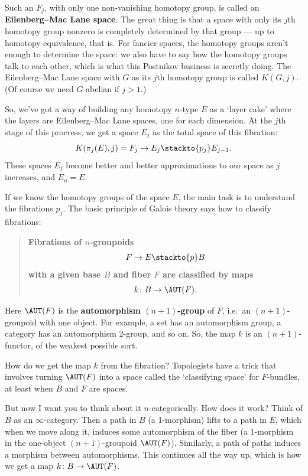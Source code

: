 \documentclass{amsart}
\begin{document}
Such an $F_j$, with only one non-vanishing homotopy group, is called
an \textbf{Eilenberg--Mac Lane space}.  The great thing is that a
space with only its $j$th homotopy group nonzero is completely
determined by that group --- up to homotopy equivalence, that is.  For
fancier spaces, the homotopy groups aren't enough to determine the
space: we also have to say how the homotopy groups talk to each other,
which is what this Postnikov business is secretly doing.  The
Eilenberg--Mac Lane space with $G$ as its $j$th homotopy group is
called $K(G,j)$.  (Of course we need $G$ abelian if $j > 1$.)  

So, we've got a way of building any homotopy $n$-type $E$ as a `layer cake' 
where the layers are Eilenberg--Mac Lane spaces, one for each dimension.
At the $j$th stage of this procress, we get a space $E_j$ as the 
total space of this fibration:
\[           K(\pi_j(E), j) = F_j \to E_j \stackto{p_j} E_{j-1} . \]
These spaces $E_j$ become better and better approximations to our space
as $j$ increases, and $E_n = E$. 

If we know the homotopy groups of the space $E$, the main task is
to understand the fibrations $p_j$.  The basic principle of Galois 
theory says how to classify fibrations:

\begin{quote}
\textbf{Fibrations of $n$-groupoids
\[   F\to E\stackto{p} B\]
with a given base $B$ and fiber $F$ are classified by maps
\[   k\colon B\to \AUT(F).\]
}
\end{quote}

Here $\AUT(F)$ is the \textbf{automorphism $(n+1)$-group} of
$F$, i.e.\ an $(n+1)$-groupoid with one object. For example, a set
has an automorphism group, a category has an automorphism 2-group, and
so on.  So, the map $k$ is an $(n+1)$-functor, of the weakest possible sort.

How do we get the map $k$ from the fibration?
Topologists have a trick that involves turning $\AUT(F)$ into a space
called the `classifying space' for $F$-bundles, 
at least when $B$ and $F$ are spaces.  

But now I want you to think about it $n$-categorically.
How does it work?  Think of $B$ as an $\infty$-category.  Then a
path in $B$ (a 1-morphism) lifts to a path in $E$, which when we move
along it, induces some automorphism of the fiber (a 1-morphism in
the one-object $(n+1)$-groupoid $\AUT(F)$).  Similarly, a path of
paths induces a morphism between automorphisms.  This continues all the
way up, which is how we get a map $k\colon B\to\AUT(F)$.
\end{document}
